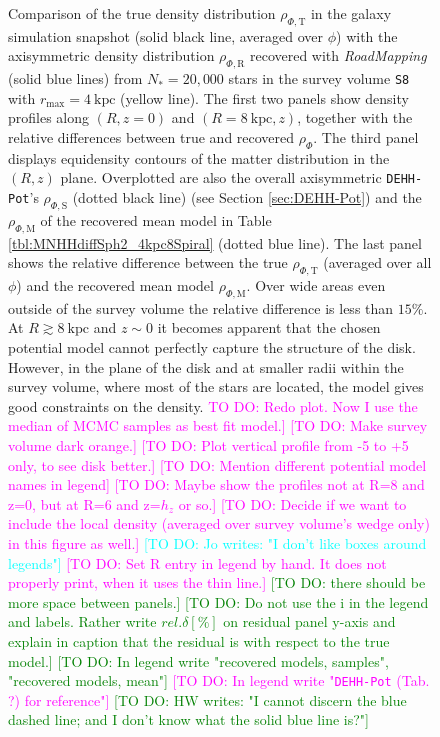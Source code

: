 \documentclass[iop,revtex4,numberedappendix,appendixfloats]{emulateapj}
\newcommand{\RM}{{\sl RoadMapping}}
\newcommand{\Wilma}[1]{\textcolor{Magenta}{#1}}
\newcommand{\HW}[1]{\textcolor{Green}{#1}}
\newcommand{\Jo}[1]{\textcolor{Cyan}{#1}}
\begin{document}
\begin{figure}[!htbp]
\caption{Comparison of the true density distribution $\rho_{\Phi,\text{T}}$ in the galaxy simulation snapshot (solid black line, averaged over $\phi$) with the axisymmetric density distribution $\rho_{\Phi,\text{R}}$ recovered with \RM{} (solid blue lines) from $N_*=20,000$ stars in the survey volume \texttt{S8} with $r_\text{max}=4~\text{kpc}$ (yellow line). The first two panels show density profiles along $(R,z=0)$ and $(R=8~\text{kpc},z)$, together with the relative differences between true and recovered $\rho_{\Phi}$. The third panel displays equidensity contours of the matter distribution in the $(R,z)$ plane. Overplotted are also the overall axisymmetric \texttt{DEHH-Pot}'s $\rho_{\Phi,\text{S}}$ (dotted black line) (see Section \ref{sec:DEHH-Pot}) and the $\rho_{\Phi,\text{M}}$ of the recovered mean model in Table \ref{tbl:MNHHdiffSph2_4kpc8Spiral} (dotted blue line). The last panel shows the relative difference between the true $\rho_{\Phi,\text{T}}$ (averaged over all $\phi$) and the recovered mean model $\rho_{\Phi,\text{M}}$. Over wide areas even outside of the survey volume the relative difference is less than $15\%$. At $R\gtrsim8~\text{kpc}$ and $z\sim0$ it becomes apparent that the chosen potential model cannot perfectly capture the structure of the disk. However, in the plane of the disk and at smaller radii within the survey volume, where most of the stars are located, the model gives good constraints on the density.  \Wilma{TO DO: Redo plot. Now I use the median of MCMC samples as best fit model.]} \Wilma{[TO DO: Make survey volume dark orange.]} \Wilma{[TO DO: Plot vertical profile from -5 to +5 only, to see disk better.]} \Wilma{[TO DO: Mention different potential model names in legend]} \Wilma{[TO DO: Maybe show the profiles not at R=8 and z=0, but at R=6 and z=$h_z$ or so.]} \Wilma{[TO DO: Decide if we want to include the local density (averaged over survey volume's wedge only) in this figure as well.]} \Jo{[TO DO: Jo writes: "I don't like boxes around legends"]} \Wilma{[TO DO: Set R entry in legend by hand. It does not properly print, when it uses the thin line.]} \HW{[TO DO: there should be more space between panels.]} \HW{[TO DO: Do not use the i in the legend and labels. Rather write $rel. \delta [\%]$ on residual panel y-axis and explain in caption that the residual is with respect to the true model.]} \HW{[TO DO: In legend write "recovered models, samples", "recovered models, mean"]} \Wilma{[TO DO: In legend write "\texttt{DEHH-Pot} (Tab. ?) for reference"]} \HW{[TO DO: HW writes: "I cannot discern the blue dashed line; and I don't know what the solid blue line is?"]}}
\label{fig:4kpc8Spiral_density}
\end{figure}
\end{document}
